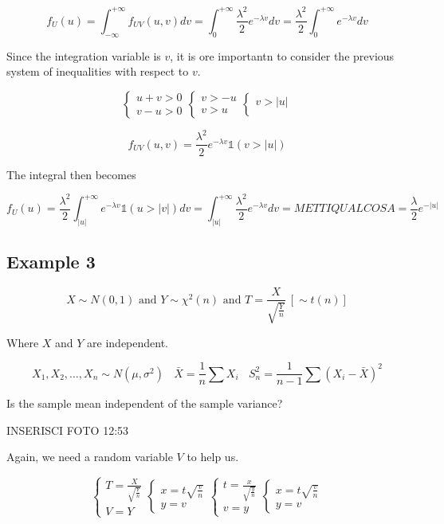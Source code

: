 \[
f_U (u) = \int_{-\infty}^{+\infty} f_{UV} (u,v) dv = \int_{0}^{+\infty} \frac{\lambda^2}{2} e^{-\lambda v} dv = \frac{\lambda^2}{2} \int_{0}^{+\infty} e^{-\lambda v} dv 
\]

Since the integration variable is \(v\), it is ore importantn to consider the previous system of inequalities with respect to \(v\).

\[
\begin{cases}
    u+v > 0 \\
    v-u > 0
\end{cases} \begin{cases}
    v > -u \\
    v > u
\end{cases} \begin{cases}
    v > |u| \\
\end{cases}
\]

\[
f_{UV} (u,v) = \frac{\lambda^2}{2} e^{-\lambda v} \mathbb{1}(v>|u|)
\]

The integral then becomes

\[
f_U (u) = \frac{\lambda^2}{2} \int_{|u|}^{+\infty} e^{-\lambda v} \mathbb{1}(u>|v|) dv = \int_{|u|}^{+\infty} \frac{\lambda^2}{2} e^{-\lambda v} dv = METTIQUALCOSA = \frac{\lambda}{2} e^{- |u|}
\]

\subsection{Example 3}

\[ X \sim N(0,1) \text{ and } Y \sim \chi^2 (n) \text{ and } T = \frac{X}{\sqrt{\frac{Y}{n}}} \ \left[ \sim t(n) \right] \]

Where \(X\) and \(Y\) are independent.

\[
X_1, X_2, \ldots, X_n \sim N(\mu,\sigma^2) \ \ \ \  \bar{X}= \frac{1}{n} \sum X_i \ \ \ \ S^2_n = \frac{1}{n-1} \sum (X_i - \bar{X})^2
\]

Is the sample mean independent of the sample variance?

INSERISCI FOTO 12:53


Again, we need a random variable \(V\) to help us.

\[
\begin{cases}
    T = \frac{X}{\sqrt{\frac{Y}{n}}} \\
    V = Y
\end{cases} \begin{cases}
    x = t \sqrt{\frac{v}{n}} \\
    y = v
\end{cases} \begin{cases}
    t = \frac{x}{\sqrt{\frac{y}{n}}} \\
    v = y 
\end{cases} \begin{cases}
    x = t \sqrt{\frac{v}{n}} \\
    y = v 
\end{cases}
\]

